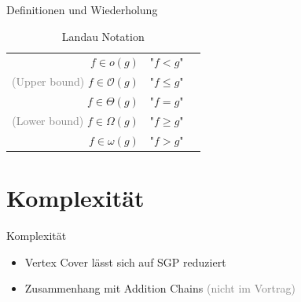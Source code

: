 \documentclass{beamer}
\begin{document}
\begin{frame}{Definitionen und Wiederholung}
\begin{table}
	\caption{Landau Notation}
	\begin{tabular}{ r p{3.5cm} l}
		
		$f \in o(g)$ & "$f < g$" \\
		\textcolor{gray}{(Upper bound)} $f \in \mathcal{O}(g)$ & "$f\leq g$" \\
		$f \in \Theta(g)$ & "$f = g$"\\
		\textcolor{gray}{(Lower bound)} $f \in \Omega(g)$ & "$f \geq g$"\\
		$f \in \omega(g)$ & "$f > g$"\\
	\end{tabular}
\end{table}
\end{frame}


\section{Komplexität}
	
\begin{frame}{Komplexität}
\begin{itemize}[<+->]
	\item Vertex Cover lässt sich auf SGP reduziert
	\item Zusammenhang mit Addition Chains \textcolor{gray}{(nicht im Vortrag)}
\end{itemize}
\end{frame}
\end{document}
